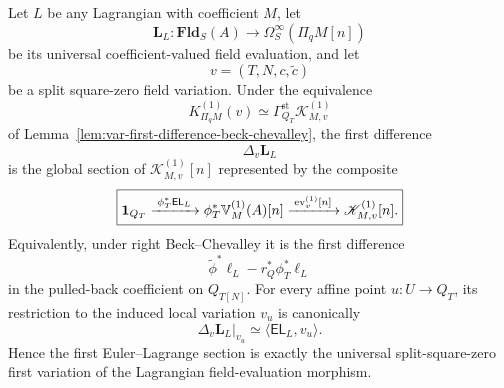 \begin{theorem}
\label{thm:var-euler-represents-first-variation}
Let \(L\) be any Lagrangian with coefficient \(M\), let
\[
    \mathbf L_L:
    \mathbf{Fld}_S(A)
    \to
    \Omega_S^\infty(\Pi_qM[n])
\]
be its universal coefficient-valued field evaluation, and let
\[
    v=(T,N,c,\widetilde c)
\]
be a split square-zero field variation. Under the equivalence
\[
    K_{\Pi_qM}^{(1)}(v)
    \simeq
    \Gamma_{Q_T}^{\mathrm{st}}
    \mathscr K^{(1)}_{M,v}
\]
of Lemma~\ref{lem:var-first-difference-beck-chevalley}, the first difference
\[
    \Delta_v\mathbf L_L
\]
is the global section of \(\mathscr K^{(1)}_{M,v}[n]\) represented by the composite
\[
    \boxed{
    \mathbf 1_{Q_T}
    \xrightarrow{\;\phi_T^*\mathsf{EL}_L\;}
    \phi_T^*\mathbb V^{(1)}_M(A)[n]
    \xrightarrow{\;\operatorname{ev}^{(1)}_v[n]\;}
    \mathscr K^{(1)}_{M,v}[n].
    }
\]
Equivalently, under right Beck--Chevalley it is the first difference
\[
    \widetilde\phi^*\ell_L
    -
    r_Q^*\phi_T^*\ell_L
\]
in the pulled-back coefficient on \(Q_{T[N]}\). For every affine point \(u:U\to Q_T\), its restriction to the induced local variation \(v_u\) is canonically
\[
    \boxed{
    \left.\Delta_v\mathbf L_L\right|_{v_u}
    \simeq
    \langle\mathsf{EL}_L,v_u\rangle.
    }
\]
Hence the first Euler--Lagrange section is exactly the universal split-square-zero first variation of the Lagrangian field-evaluation morphism.
\end{theorem}

